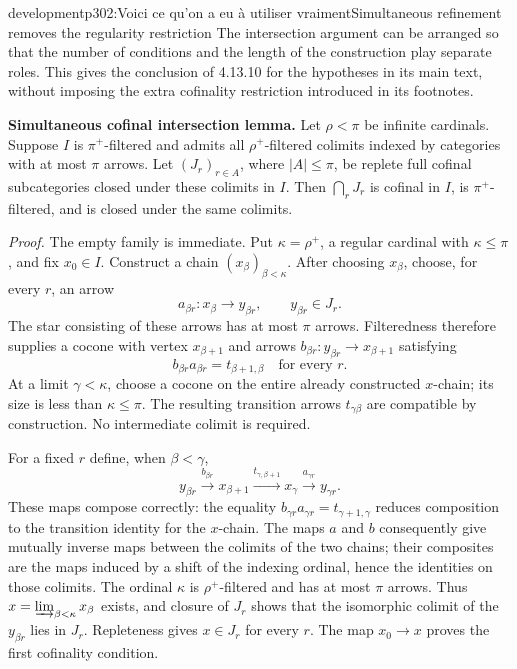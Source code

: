 \begin{dcomment}{development}{p302:Voici ce qu'on a eu à utiliser vraiment}{Simultaneous refinement removes the regularity restriction}
The intersection argument can be arranged so that the number of conditions and the length of the construction play separate roles. This gives the conclusion of 4.13.10 for the hypotheses in its main text, without imposing the extra cofinality restriction introduced in its footnotes.

\textbf{Simultaneous cofinal intersection lemma.}\ours
Let $\rho<\pi$ be infinite cardinals. Suppose $I$ is $\pi^+$-filtered and admits all $\rho^+$-filtered colimits indexed by categories with at most $\pi$ arrows. Let $(J_r)_{r\in A}$, where $|A|\leq\pi$, be replete full cofinal subcategories closed under these colimits in $I$. Then $\bigcap_rJ_r$ is cofinal in $I$, is $\pi^+$-filtered, and is closed under the same colimits.

\textit{Proof.} The empty family is immediate. Put $\kappa=\rho^+$, a regular cardinal with $\kappa\leq\pi$, and fix $x_0\in I$. Construct a chain $(x_\beta)_{\beta<\kappa}$. After choosing $x_\beta$, choose, for every $r$, an arrow
\[
 a_{\beta r}:x_\beta\longrightarrow y_{\beta r},\qquad y_{\beta r}\in J_r.
\]
The star consisting of these arrows has at most $\pi$ arrows. Filteredness therefore supplies a cocone with vertex $x_{\beta+1}$ and arrows $b_{\beta r}:y_{\beta r}\to x_{\beta+1}$ satisfying
\[
 b_{\beta r}a_{\beta r}=t_{\beta+1,\beta}
 \quad\text{for every }r.
\]
At a limit $\gamma<\kappa$, choose a cocone on the entire already constructed $x$-chain; its size is less than $\kappa\leq\pi$. The resulting transition arrows $t_{\gamma\beta}$ are compatible by construction. No intermediate colimit is required.

For a fixed $r$ define, when $\beta<\gamma$,
\[
 y_{\beta r}\xrightarrow{b_{\beta r}}x_{\beta+1}
 \xrightarrow{t_{\gamma,\beta+1}}x_\gamma
 \xrightarrow{a_{\gamma r}}y_{\gamma r}.
\]
These maps compose correctly: the equality $b_{\gamma r}a_{\gamma r}=t_{\gamma+1,\gamma}$ reduces composition to the transition identity for the $x$-chain. The maps $a$ and $b$ consequently give mutually inverse maps between the colimits of the two chains; their composites are the maps induced by a shift of the indexing ordinal, hence the identities on those colimits. The ordinal $\kappa$ is $\rho^+$-filtered and has at most $\pi$ arrows. Thus $x=\varinjlim_{\beta<\kappa}x_\beta$ exists, and closure of $J_r$ shows that the isomorphic colimit of the $y_{\beta r}$ lies in $J_r$. Repleteness gives $x\in J_r$ for every $r$. The map $x_0\to x$ proves the first cofinality condition.


\end{dcomment}
